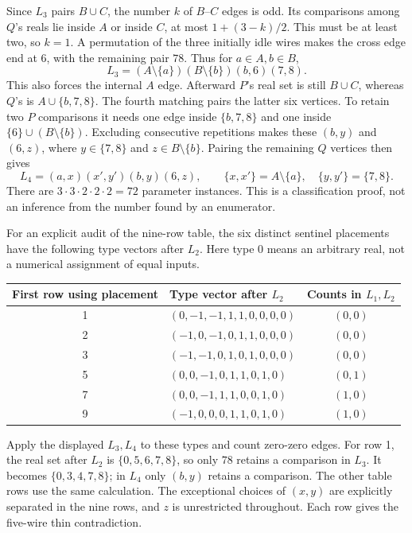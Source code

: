 \documentclass[11pt]{article}
\begin{document}
Since $L_3$ pairs $B\cup C$, the number $k$ of $B$--$C$ edges is odd. Its comparisons among $Q$'s reals lie inside $A$ or inside $C$, at most $1+(3-k)/2$. This must be at least two, so $k=1$. A permutation of the three initially idle wires makes the cross edge end at 6, with the remaining pair $78$. Thus for $a\in A,b\in B$,
\[
L_3=(A\setminus\{a\})(B\setminus\{b\})(b,6)(7,8).
\]
This also forces the internal $A$ edge. Afterward $P$'s real set is still $B\cup C$, whereas $Q$'s is $A\cup\{b,7,8\}$. The fourth matching pairs the latter six vertices. To retain two $P$ comparisons it needs one edge inside $\{b,7,8\}$ and one inside $\{6\}\cup(B\setminus\{b\})$. Excluding consecutive repetitions makes these $(b,y)$ and $(6,z)$, where $y\in\{7,8\}$ and $z\in B\setminus\{b\}$. Pairing the remaining $Q$ vertices then gives
\[
L_4=(a,x)(x',y')(b,y)(6,z),\qquad
\{x,x'\}=A\setminus\{a\},\quad\{y,y'\}=\{7,8\}.
\]
There are $3\cdot3\cdot2\cdot2\cdot2=72$ parameter instances. This is a classification proof, not an inference from the number found by an enumerator.

For an explicit audit of the nine-row table, the six distinct sentinel placements have the following type vectors after $L_2$. Here type 0 means an arbitrary real, not a numerical assignment of equal inputs.
\begin{center}\small
\begin{tabular}{clc}\toprule
First row using placement & Type vector after $L_2$ & Counts in $L_1,L_2$\\\midrule
1 & $(0,-1,-1,1,1,0,0,0,0)$ & $(0,0)$\\
2 & $(-1,0,-1,0,1,1,0,0,0)$ & $(0,0)$\\
3 & $(-1,-1,0,1,0,1,0,0,0)$ & $(0,0)$\\
5 & $(0,0,-1,0,1,1,0,1,0)$ & $(0,1)$\\
7 & $(0,0,-1,1,1,0,0,1,0)$ & $(1,0)$\\
9 & $(-1,0,0,0,1,1,0,1,0)$ & $(1,0)$\\\bottomrule
\end{tabular}\end{center}
Apply the displayed $L_3,L_4$ to these types and count zero-zero edges. For row 1, the real set after $L_2$ is $\{0,5,6,7,8\}$, so only $78$ retains a comparison in $L_3$. It becomes $\{0,3,4,7,8\}$; in $L_4$ only $(b,y)$ retains a comparison. The other table rows use the same calculation. The exceptional choices of $(x,y)$ are explicitly separated in the nine rows, and $z$ is unrestricted throughout. Each row gives the five-wire thin contradiction.
\end{document}
